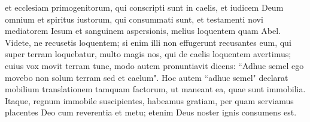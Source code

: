 \begin{biblechapter}
\verse et ecclesiam primogenitorum, qui conscripti sunt in caelis, et iudicem Deum omnium et spiritus iustorum, qui consummati sunt, 
\verse et testamenti novi mediatorem Iesum et sanguinem aspersionis, melius loquentem quam Abel. 
\verse Videte, ne recusetis loquentem; si enim illi non effugerunt recusantes eum, qui super terram loquebatur, multo magis nos, qui de caelis loquentem avertimus; 
\verse cuius vox movit terram tunc, modo autem pronuntiavit dicens: “Adhuc semel ego movebo non solum terram sed et caelum". 
\verse Hoc autem “adhuc semel" declarat mobilium translationem tamquam factorum, ut maneant ea, quae sunt immobilia. 
\verse Itaque, regnum immobile suscipientes, habeamus gratiam, per quam serviamus placentes Deo cum reverentia et metu; 
\verse etenim Deus noster ignis consumens est. 
\end{biblechapter}

